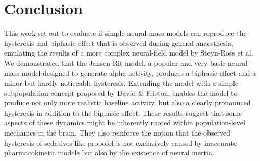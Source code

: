 \section{Conclusion}
This work set out to evaluate if simple neural-mass models can reproduce the hysteresis and biphasic effect
that is observed during general anaesthesia,
emulating the results of a more complex neural-field model by Steyn-Ross et al.
We demonstrated that the Jansen-Rit model,
a popular and very basic neural-mass model designed to generate alpha-activity,
produces a biphasic effect and a minor but hardly noticeable hysteresis.
Extending the model with a simple subpopulation concept proposed by David \& Friston, enables the model to produce
not only more realistic baseline activity, but also a clearly pronounced hysteresis in addition to the biphasic effect.
These results suggest that some aspects of these dynamics might be inherently rooted
within population-level mechanics in the brain.
They also reinforce the notion that the observed hysteresis of sedatives like
propofol is not exclusively caused by inaccurate pharmacokinetic models but also by the existence of neural inertia.
